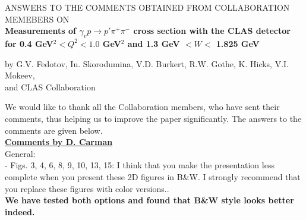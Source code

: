 \documentclass[,superscriptaddress,showpacs,amssymb,amsmath,amsfonts,linenumbers,article]{revtex4-1}
\begin{document}
\begin{center}
\vspace{2cm}
{\Large ANSWERS TO THE COMMENTS OBTAINED FROM COLLABORATION MEMEBERS ON}\\[0.7cm]  

{\bf \large
Measurements of $\gamma_{v} p \rightarrow p' \pi^{+} \pi^{-}$ cross section with the CLAS detector for 0.4 GeV$^2 < Q^2 < 1.0$ GeV$^2$ and 1.3 GeV $< W <$ 1.825 GeV \\[0.7cm]}

by G.V. Fedotov, Iu. Skorodumina, V.D. Burkert, R.W. Gothe, K. Hicks, V.I. Mokeev,\\ and CLAS Collaboration\\[1cm]
\end{center}

We would like to thank all the Collaboration members, who have sent their comments, thus helping us to improve the paper significantly. The answers to the comments are given below.\\


{\vspace{1cm} \bf \Large \underline{Comments by D. Carman}}\\[0.5cm]


General:\\[0.5cm]

- Figs. 3, 4, 6, 8, 9, 10, 13, 15: I think that you make the presentation less complete when you present these 2D figures in B\&W. I strongly recommend that you replace these figures with color versions..\\
{\bf We have tested both options and found that B\&W style looks better indeed.}\\[`.5cm]
\end{document}
